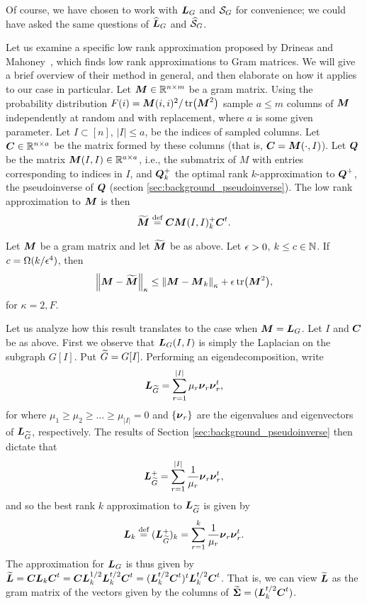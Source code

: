 Of course, we have chosen to work with $\vb*{L}_G$ and $\mathcal{S}_G$ for convenience; we could have asked the same questions of $\widehat{\vb*{L}}_G$ and $\widehat{\mathcal{S}}_G$. 

Let us examine a specific low rank approximation proposed by Drineas and Mahoney~\cite{drineas2005approximating}, which finds low rank approximations to Gram matrices. We will give a brief overview of their method in general, and then elaborate on how it applies to our case in particular. Let ${\vb*{M}}\in\mathbb{R}^{n\times m}$ be a gram matrix. Using the probability distribution $F(i) = {\vb*{M}}(i,i)^2 / \tr({\vb*{M}}^2)$ sample $a\leq m$ columns of ${\vb*{M}}$ independently at random and with replacement, where $a$ is some given parameter. Let $I\subset[n]$, $|I|\leq a$, be the indices of sampled columns. Let $\vb*{C}\in\mathbb{R}^{n\times a}$ be the matrix formed by these columns (that is, $\vb*{C}={\vb*{M}}(\cdot,I)$).  Let $\vb*{Q}$ be the matrix ${\vb*{M}}(I,I)\in\mathbb{R}^{a\times a}$, i.e., the submatrix of $M$ with entries corresponding to indices in $I$, and $\vb*{Q}^+_k$  the optimal rank $k$-approximation to $\vb*{Q}^+$, the pseudoinverse of $\vb*{Q}$ (section \ref{sec:background_pseudoinverse}). The low rank approximation to ${\vb*{M}}$ is then 
\begin{equation*}
\widetilde{{\vb*{M}}} \overset{\text{def}}{=} \vb*{C}{\vb*{M}}(I,I)_k^+\vb*{C}^t.
\end{equation*}

\begin{theorem}
	Let ${\vb*{M}}$ be a gram matrix and let $\widetilde{{\vb*{M}}}$ be as above. Let $\epsilon>0$,  $k\leq c\in\mathbb{N}$. If $c=\Omega(k/\epsilon^4)$, then 
	\begin{equation*}
	\norm{{\vb*{M}}-\widetilde{{\vb*{M}}}}_\kappa \leq \norm{{\vb*{M}}-{\vb*{M}}_k}_\kappa + \epsilon \tr({\vb*{M}}^2),
	\end{equation*}
	for $\kappa=2,F$. 
\end{theorem}

Let us analyze how this result translates to the case when ${\vb*{M}}=\vb*{L}_G$. Let $I$ and $\vb*{C}$ be as above. First we observe that $\vb*{L}_G(I,I)$ is simply the Laplacian on the subgraph $G[I]$. Put ${\widetilde{G}} = G[I]$. Performing an eigendecomposition, write 
\begin{equation*}
\vb*{L}_{\widetilde{G}} = \sum_{r=1}^{|I|} \mu_r \vb*{\nu}_r\vb*{\nu}_r^t,
\end{equation*}
for where $\mu_1\geq \mu_2\geq \dots \geq \mu_{|I|}=0$ and $\{\vb*{\nu}_r\}$ are the eigenvalues and eigenvectors of $\vb*{L}_{\widetilde{G}}$, respectively. The results of Section \ref{sec:background_pseudoinverse} then dictate that 
\begin{equation*}
\vb*{L}_{\widetilde{G}}^+ = \sum_{r=1}^{|I|} \frac{1}{\mu_r} \vb*{\nu}_r\vb*{\nu}_r^t,
\end{equation*}
and so the best rank $k$ approximation to $\vb*{L}_{\widetilde{G}}$ is given by 
\begin{equation*}
\vb*{L}_k \overset{\text{def}}{=} (\vb*{L}_{\widetilde{G}}^+)_k = \sum_{r=1}^{k} \frac{1}{\mu_r} \vb*{\nu}_r\vb*{\nu}_r^t.
\end{equation*}
The approximation for $\vb*{L}_G$ is thus given by $\widetilde{\vb*{L}}=\vb*{C}\vb*{L}_k\vb*{C}^t=\vb*{C}\vb*{L}_k^{1/2}\vb*{L}_k^{t/2}\vb*{C}^t = (\vb*{L}_k^{t/2}\vb*{C}^t)^t \vb*{L}_k^{t/2}\vb*{C}^t$. That is, we can view $\widetilde{\vb*{L}}$ as the gram matrix of the vectors given by the columns of $\widetilde{\boldsymbol{\Sigma}} =  (\vb*{L}_k^{t/2}\vb*{C}^t)$. 

